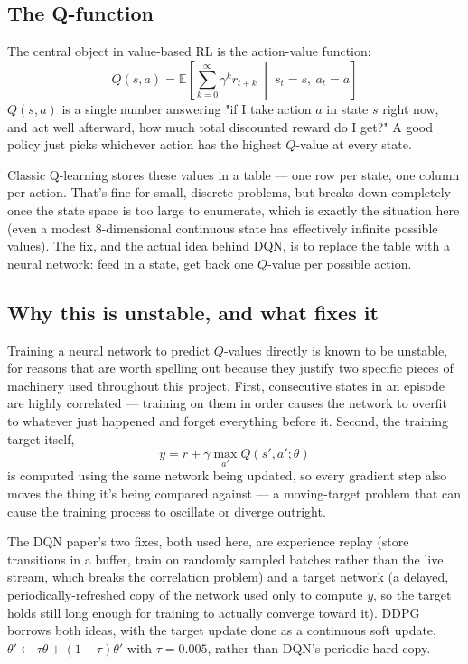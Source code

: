 \documentclass{rapportINPTCLOUD}
\begin{document}
\subsection{The Q-function}

The central object in value-based RL is the action-value function:
\begin{equation}
Q(s,a) = \mathbb{E}\left[\sum_{k=0}^{\infty} \gamma^k r_{t+k} \;\middle|\; s_t=s,\ a_t=a\right]
\end{equation}
$Q(s,a)$ is a single number answering "if I take action $a$ in state $s$ right now, and act well afterward, how much total discounted reward do I get?" A good policy just picks whichever action has the highest $Q$-value at every state.

Classic Q-learning stores these values in a table — one row per state, one column per action. That's fine for small, discrete problems, but breaks down completely once the state space is too large to enumerate, which is exactly the situation here (even a modest 8-dimensional continuous state has effectively infinite possible values). The fix, and the actual idea behind DQN, is to replace the table with a neural network: feed in a state, get back one $Q$-value per possible action.

\subsection{Why this is unstable, and what fixes it}

Training a neural network to predict $Q$-values directly is known to be unstable, for reasons that are worth spelling out because they justify two specific pieces of machinery used throughout this project. First, consecutive states in an episode are highly correlated — training on them in order causes the network to overfit to whatever just happened and forget everything before it. Second, the training target itself,
\begin{equation}
y = r + \gamma \max_{a'} Q(s', a'; \theta)
\end{equation}
is computed using the same network being updated, so every gradient step also moves the thing it's being compared against — a moving-target problem that can cause the training process to oscillate or diverge outright.

The DQN paper's two fixes, both used here, are experience replay (store transitions in a buffer, train on randomly sampled batches rather than the live stream, which breaks the correlation problem) and a target network (a delayed, periodically-refreshed copy of the network used only to compute $y$, so the target holds still long enough for training to actually converge toward it). DDPG borrows both ideas, with the target update done as a continuous soft update, $\theta' \leftarrow \tau\theta + (1-\tau)\theta'$ with $\tau=0.005$, rather than DQN's periodic hard copy.
\end{document}
